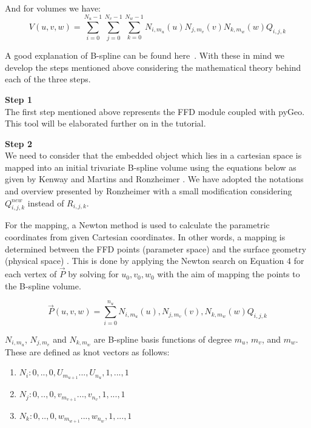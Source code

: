 \documentclass[12pt]{article}
\begin{document}
And for volumes we have: \vspace{4mm} 
\begin{equation}
    V(u,v,w)= \sum^{N_{u}-1}_{i=0}\sum^{N_{v}-1}_{j=0}\sum^{N_{w}-1}_{k=0} N_{i,m_u}(u)N_{j,m_v}(v)N_{k,m_w}(w) Q_{i,j,k}
\end{equation}

\noindent A good explanation of B-spline can be found here~\cite{Bspline}. With these in mind we develop the steps mentioned above considering the mathematical theory behind each of the three steps.\vspace{4mm} 

\textbf{Step 1}\\
The first step mentioned above represents the FFD module coupled with pyGeo. This tool will be elaborated further on in the tutorial. \vspace{4mm} 

\textbf{Step 2}\\
We need to consider that the embedded object which lies in a cartesian space is mapped into an initial trivariate B-spline volume using the equations below as given by Kenway and Martins \cite{kenway} and Ronzheimer \cite{Ronzheimer2004}. We have adopted the notations and overview presented by Ronzheimer \cite{Ronzheimer2002,Ronzheimer2004} with a small modification considering $Q_{i,j,k}^{new}$ instead of $R_{i,j,k}$. \vspace{4mm} 

\noindent For the mapping, a Newton method is used to calculate the parametric coordinates from given Cartesian coordinates\cite{Ronzheimer2006, He2018}. In other words, a mapping is determined between the FFD points (parameter space) and the surface geometry (physical space) \cite{He2018}. This is done by applying the Newton search on Equation 4 for each vertex of  $\overrightarrow{P}$ by solving for $u_0, v_0, w_0$ with the aim of mapping the points to the B-spline volume.

\begin{equation}
    \overrightarrow{P}(u,v,w)= \sum_{i=0}^{n_u}N_{i,m_{u}}(u),N_{j,m_{v}}(v),N_{k,m_{w}}(w)Q_{i,j,k}
\end{equation}

$N_{i,m_{u}}$, $N_{j,m_{v}}$ and $N_{k,m_{w}}$ are B-spline basis functions of degree $m_u$, $m_v$, and $m_w$. These are defined as knot vectors as follows:\vspace{4mm} 
\begin{enumerate}
    \item $N_i:{0,..,0,U_{m_{u+1}}...,U_{n_{u}},1,...,1}$
    \item $N_j:{0,..,0,v_{m_{v+1}}...,v_{n_{v}},1,...,1}$
    \item $N_k:{0,..,0,w_{m_{w+1}}...,w_{n_{w}},1,...,1}$
\end{enumerate}
\end{document}
